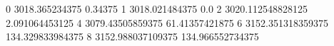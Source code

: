 0 3018.365234375 0.34375
1 3018.021484375 0.0
2 3020.112548828125 2.091064453125
4 3079.43505859375 61.41357421875
6 3152.351318359375 134.329833984375
8 3152.988037109375 134.966552734375
